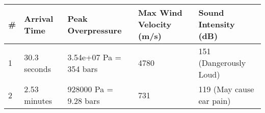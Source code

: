 \documentclass[
]{article}
\begin{document}
\begin{longtable}[]{@{}lllll@{}}
\toprule
\begin{minipage}[b]{0.03\columnwidth}\raggedright
\#\strut
\end{minipage} & \begin{minipage}[b]{0.12\columnwidth}\raggedright
Arrival Time\strut
\end{minipage} & \begin{minipage}[b]{0.29\columnwidth}\raggedright
Peak Overpressure\strut
\end{minipage} & \begin{minipage}[b]{0.22\columnwidth}\raggedright
Max Wind Velocity (m/s)\strut
\end{minipage} & \begin{minipage}[b]{0.21\columnwidth}\raggedright
Sound Intensity (dB)\strut
\end{minipage}\tabularnewline
\midrule
\endhead
\begin{minipage}[t]{0.03\columnwidth}\raggedright
1\strut
\end{minipage} & \begin{minipage}[t]{0.12\columnwidth}\raggedright
30.3 seconds\strut
\end{minipage} & \begin{minipage}[t]{0.29\columnwidth}\raggedright
3.54e+07 Pa = 354 bars\strut
\end{minipage} & \begin{minipage}[t]{0.22\columnwidth}\raggedright
4780\strut
\end{minipage} & \begin{minipage}[t]{0.21\columnwidth}\raggedright
151 (Dangerously Loud)\strut
\end{minipage}\tabularnewline
\begin{minipage}[t]{0.03\columnwidth}\raggedright
2\strut
\end{minipage} & \begin{minipage}[t]{0.12\columnwidth}\raggedright
2.53 minutes\strut
\end{minipage} & \begin{minipage}[t]{0.29\columnwidth}\raggedright
928000 Pa = 9.28 bars\strut
\end{minipage} & \begin{minipage}[t]{0.22\columnwidth}\raggedright
731\strut
\end{minipage} & \begin{minipage}[t]{0.21\columnwidth}\raggedright
119 (May cause ear pain)\strut
\end{minipage}\tabularnewline

\end{longtable}
\end{document}
